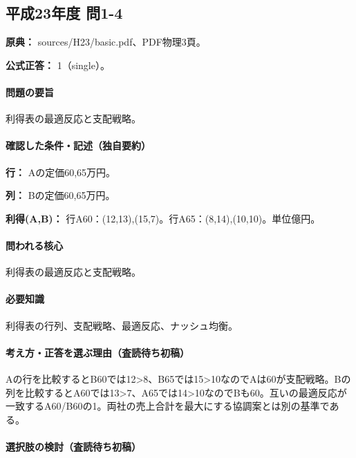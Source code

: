 \subsection{平成23年度 問1-4}
\label{q:h23-reg-basic-1-4}

\noindent\textbf{原典：} sources/H23/basic.pdf、PDF物理3頁。

\textbf{公式正答：} 1（single）。

\paragraph{問題の要旨} 利得表の最適反応と支配戦略。

\paragraph{確認した条件・記述（独自要約）}\mbox{}\par

\noindent\textbf{行：} Aの定価60,65万円。\par

\noindent\textbf{列：} Bの定価60,65万円。\par

\noindent\textbf{利得(A,B)：} 行A60：(12,13),(15,7)。行A65：(8,14),(10,10)。単位億円。\par

\paragraph{問われる核心} 利得表の最適反応と支配戦略。

\paragraph{必要知識} 利得表の行列、支配戦略、最適反応、ナッシュ均衡。

\paragraph{考え方・正答を選ぶ理由（査読待ち初稿）} Aの行を比較するとB60では12>8、B65では15>10なのでAは60が支配戦略。Bの列を比較するとA60では13>7、A65では14>10なのでBも60。互いの最適反応が一致するA60/B60の1。両社の売上合計を最大にする協調案とは別の基準である。

\paragraph{選択肢の検討（査読待ち初稿）}\mbox{}\par

